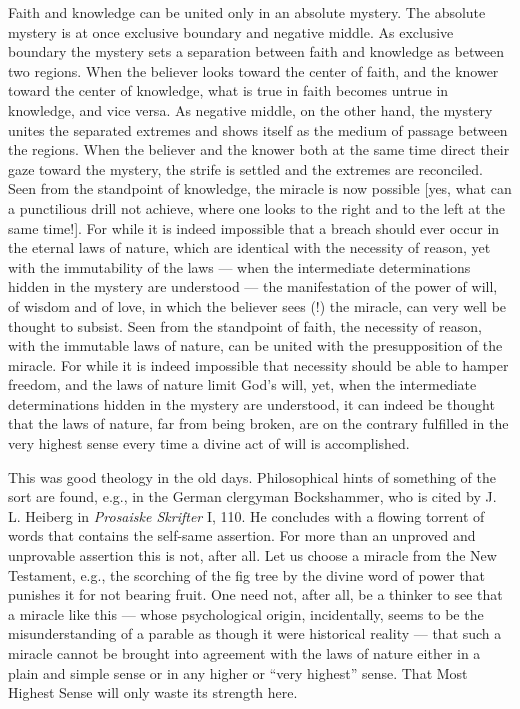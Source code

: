 \documentclass[12pt,a4paper,openany]{book}
\newcommand{\opage}[1]{\marginnote{\footnotesize\textit{[#1]}}}
\begin{document}
{\small
\opage{90}Faith and knowledge can be united only in an absolute mystery. The
absolute mystery is at once exclusive boundary and negative middle. As
exclusive boundary the mystery sets a separation between faith and knowledge
as between two regions. When the believer looks toward the center of faith,
and the knower toward the center of knowledge, what is true in faith becomes
untrue in knowledge, and vice versa. As negative middle, on the other hand,
the mystery unites the separated extremes and shows itself as the medium of
passage between the regions.
When the believer and the knower both at the same time direct their gaze
toward the mystery, the strife is settled and the extremes are reconciled.
Seen from the standpoint of knowledge, the miracle is now possible [yes, what
can a punctilious drill not achieve, where one looks to the right and to the
left at the same time!]. For while it is indeed impossible that a breach
should ever occur in the eternal laws of nature, which are identical with the
necessity of reason, yet with the immutability of the laws --- when the
intermediate determinations hidden in the mystery are understood --- the
manifestation of the power of will, of wisdom and of love, in which the
believer sees (!) the miracle, can very well be thought to subsist. Seen from
the standpoint of faith, the necessity of reason, with the immutable laws of
nature, can be united with the presupposition of the miracle. For while it is
indeed impossible that necessity should be able to hamper freedom, and the
laws of nature limit God's will, yet, when the intermediate determinations
hidden in the mystery are understood, it can indeed be thought that the laws
of nature, far from being broken, are on the contrary fulfilled in the very
highest sense every time a divine act of will is accomplished.\par}

This was good theology in the old days. Philosophical hints of
something of the sort are found, e.g., in the German clergyman
Bockshammer, who is cited by J. L. Heiberg in \emph{Prosaiske Skrifter} I, 110.
He concludes with a flowing torrent of words that contains the
self-same assertion. For more than an unproved and unprovable assertion
this is not, after all. Let us choose a miracle from the New Testament,
e.g., the scorching of the fig tree by the divine word of power that
punishes it for not bearing fruit. One need not, after all, be a thinker
to see that a miracle like this --- whose psychological origin,
incidentally, seems to be the misunderstanding of a parable as though it
were historical reality --- that such a miracle cannot be brought into
agreement with the laws of nature either in a plain and simple sense or
in any higher or ``very highest'' sense. That Most Highest Sense will
only waste its strength here.
\end{document}
